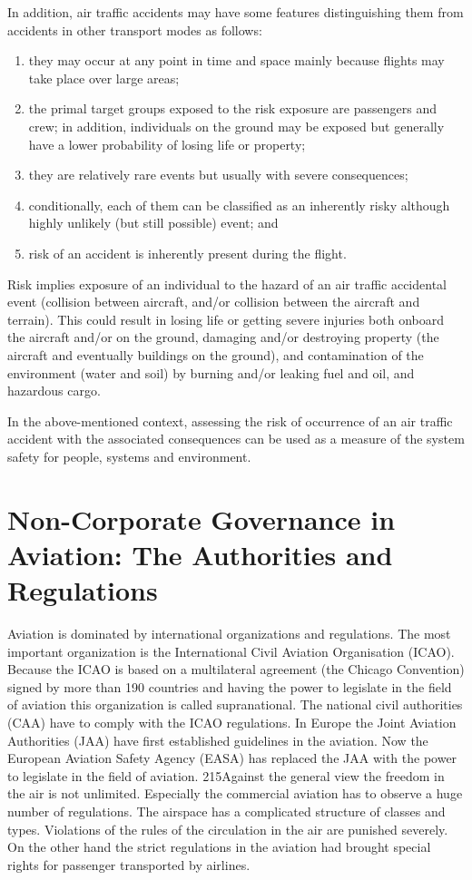 \documentclass[a4paper, 10pt]{article}
\begin{document}
In addition, air traffic accidents may have some features
distinguishing them from accidents in other transport modes as
follows: 
\begin{enumerate}
		\item they may occur at any point in time and space
mainly because flights may take place over large areas; 
		\item the
primal target groups exposed to the risk exposure are
passengers and crew; in addition, individuals on the ground
may be exposed but generally have a lower probability of
losing life or property; 
		\item they are relatively rare events but
usually with severe consequences; 
		\item conditionally, each of
them can be classified as an inherently risky although highly
unlikely (but still possible) event; and 
		\item risk of an accident is inherently present during the flight.
\end{enumerate}
\par

Risk implies exposure of an individual to the hazard of an
air traffic accidental event (collision between aircraft, and/or
collision between the aircraft and terrain). This could result in
losing life or getting severe injuries both onboard the aircraft
and/or on the ground, damaging and/or destroying property (the
aircraft and eventually buildings on the ground), and
contamination of the environment (water and soil) by burning
and/or leaking fuel and oil, and hazardous cargo.\par

In the above-mentioned context, assessing the risk of
occurrence of an air traffic accident with the associated
consequences can be used as a measure of the system safety for
people, systems and environment.\par
\section{Non-Corporate Governance in Aviation: The Authorities and Regulations}
Aviation is dominated by international organizations and regulations. The most important organization is the International Civil Aviation Organisation (ICAO). Because the ICAO is
based on a multilateral agreement (the Chicago Convention) signed by more than 190 countries
and having the power to legislate in the field of aviation this organization is called supranational.
The national civil authorities (CAA) have to comply with the ICAO regulations. In
Europe the Joint Aviation Authorities (JAA) have first established guidelines in the aviation.
Now the European Aviation Safety Agency (EASA) has replaced the JAA with the power to
legislate in the field of aviation.
215Against the general view the freedom in the air is not unlimited. Especially the commercial
aviation has to observe a huge number of regulations. The airspace has a complicated structure
of classes and types. Violations of the rules of the circulation in the air are punished severely.
On the other hand the strict regulations in the aviation had brought special rights for
passenger transported by airlines.\par
\end{document}
